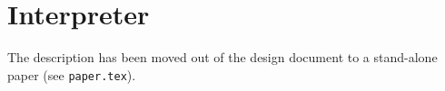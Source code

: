 
\chapter{Interpreter} \label{ch:interpreter}

The description has been moved out of the design document to a stand-alone paper (see \texttt{paper.tex}).